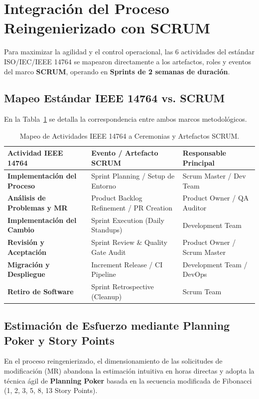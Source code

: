 \documentclass[12pt]{article}
\begin{document}
\section{Integración del Proceso Reingenierizado con SCRUM}

Para maximizar la agilidad y el control operacional, las 6 actividades del estándar ISO/IEC/IEEE 14764 se mapearon directamente a los artefactos, roles y eventos del marco \textbf{SCRUM}, operando en \textbf{Sprints de 2 semanas de duración}.

\subsection{Mapeo Estándar IEEE 14764 vs. SCRUM}
En la Tabla~\ref{tab:scrum_mapping} se detalla la correspondencia entre ambos marcos metodológicos.

\begin{table}[H]
    \centering
    \caption{Mapeo de Actividades IEEE 14764 a Ceremonias y Artefactos SCRUM.}
    \label{tab:scrum_mapping}
    \small
    \color{black}
    \begin{tabularx}{\textwidth}{XXp{4.5cm}}
        \toprule
        \textbf{Actividad IEEE 14764} & \textbf{Evento / Artefacto SCRUM} & \textbf{Responsable Principal} \\
        \midrule
        \textbf{Implementación del Proceso} & Sprint Planning / Setup de Entorno & Scrum Master / Dev Team \\
        \rowcolor{darkcard}
        \textbf{Análisis de Problemas y MR} & Product Backlog Refinement / PR Creation & Product Owner / QA Auditor \\
        \textbf{Implementación del Cambio} & Sprint Execution (Daily Standups) & Development Team \\
        \rowcolor{darkcard}
        \textbf{Revisión y Aceptación} & Sprint Review \& Quality Gate Audit & Product Owner / Scrum Master \\
        \textbf{Migración y Despliegue} & Increment Release / CI Pipeline & Development Team / DevOps \\
        \rowcolor{darkcard}
        \textbf{Retiro de Software} & Sprint Retrospective (Cleanup) & Scrum Team \\
        \bottomrule
    \end{tabularx}
\end{table}

\subsection{Estimación de Esfuerzo mediante Planning Poker y Story Points}
En el proceso reingenierizado, el dimensionamiento de las solicitudes de modificación (MR) abandona la estimación intuitiva en horas directas y adopta la técnica ágil de \textbf{Planning Poker} basada en la secuencia modificada de Fibonacci (1, 2, 3, 5, 8, 13 Story Points).
\end{document}
